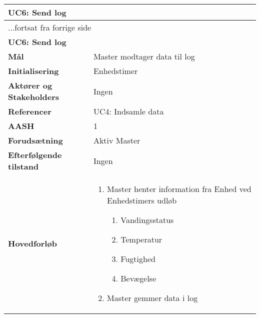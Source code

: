 \begin{center} \centering \label{UC6}
	\begin{longtable}{|p{5cm}|p{9cm}|}  %
	\hline
		\multicolumn{2}{|l|}{\textbf{UC6: Send log}} \\\hline %
		\endfirsthead
		
		\multicolumn{2}{l}{...fortsat fra forrige side} \\ \hline %
		\multicolumn{2}{|l|}{\textbf{UC6: Send log}} \\\hline %
		\endhead	
		
		\textbf{Mål}								&Master modtager data til log	\\\hline
		\textbf{Initialisering}					&Enhedstimer					\\\hline
		\textbf{Aktører og Stakeholders}			&Ingen						\\\hline
		\textbf{Referencer}						&UC4: Indsamle data			\\\hline
		\textbf{AASH}							&1							\\\hline
		\textbf{Forudsætning}					&Aktiv Master				\\\hline
		\textbf{Efterfølgende tilstand}			&Ingen						\\\hline
		\textbf{Hovedforløb}					
			&\begin{enumerate}
	
				\item Master henter information fra Enhed ved Enhedstimers udløb
				
				\begin{enumerate}
					\item Vandingsstatus
					\item Temperatur
					\item Fugtighed
					\item Bevægelse
				\end{enumerate}
				
				\item Master gemmer data i log

			\end{enumerate}\\\hline
	\end{longtable} 
\end{center}


